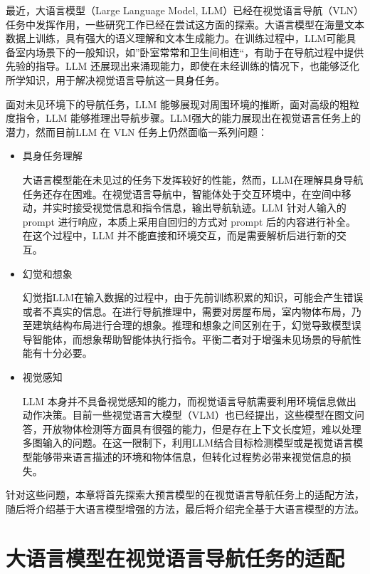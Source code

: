 \documentclass[bachelor]{thesis-uestc}
\begin{document}
最近，大语言模型（Large Language Model, LLM）已经在视觉语言导航（VLN）任务中发挥作用，一些研究工作已经在尝试这方面的探索。大语言模型在海量文本数据上训练，具有强大的语义理解和文本生成能力。在训练过程中，LLM可能具备室内场景下的一般知识，如”卧室常常和卫生间相连“，有助于在导航过程中提供先验的指导。LLM 还展现出来涌现能力，即使在未经训练的情况下，也能够泛化所学知识，用于解决视觉语言导航这一具身任务。

面对未见环境下的导航任务，LLM 能够展现对周围环境的推断，面对高级的粗粒度指令，LLM 能够推理出导航步骤。LLM强大的能力展现出在视觉语言任务上的潜力，然而目前LLM 在 VLN 任务上仍然面临一系列问题：

\begin{itemize}
    \item 具身任务理解
    
    大语言模型能在未见过的任务下发挥较好的性能，然而，LLM在理解具身导航任务还存在困难。在视觉语言导航中，智能体处于交互环境中，在空间中移动，并实时接受视觉信息和指令信息，输出导航轨迹。LLM 针对人输入的 prompt 进行响应，本质上采用自回归的方式对 prompt 后的内容进行补全。在这个过程中，LLM 并不能直接和环境交互，而是需要解析后进行新的交互。

    \item 幻觉和想象
    
    幻觉指LLM在输入数据的过程中，由于先前训练积累的知识，可能会产生错误或者不真实的信息。在进行导航推理中，需要对房屋布局，室内物体布局，乃至建筑结构布局进行合理的想象。推理和想象之间区别在于，幻觉导致模型误导智能体，而想象帮助智能体执行指令。平衡二者对于增强未见场景的导航性能有十分必要。

    \item 视觉感知
    
    LLM 本身并不具备视觉感知的能力，而视觉语言导航需要利用环境信息做出动作决策。目前一些视觉语言大模型（VLM）也已经提出，这些模型在图文问答，开放物体检测等方面具有很强的能力，但是存在上下文长度短，难以处理多图输入的问题。在这一限制下，利用LLM结合目标检测模型或是视觉语言模型能够带来语言描述的环境和物体信息，但转化过程势必带来视觉信息的损失。
\end{itemize}

针对这些问题，本章将首先探索大预言模型的在视觉语言导航任务上的适配方法，随后将介绍基于大语言模型增强的方法，最后将介绍完全基于大语言模型的方法。

\section{大语言模型在视觉语言导航任务的适配}
\end{document}
